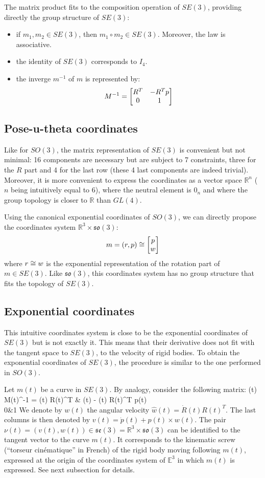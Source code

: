 \documentclass{book}
\begin{document}
The matrix product fits to the composition operation of $SE(3)$, providing directly the group structure of $SE(3)$:
\begin{itemize}
\item if $m_1,m_2 \in SE(3)$, then $m_1 \circ m_2 \in SE(3)$. Moreover, the law is associative.
\item the identity of $SE(3)$ corresponds to $I_4$.
\item the inverge $m^{-1}$ of $m$ is represented by:
\[ M^{-1} = \begin{bmatrix} R^T & -R^T p \\ 0 & 1 \end{bmatrix} \]
\end{itemize}

\subsection{Pose-u-theta coordinates}

Like for $SO(3)$, the matrix representation of $SE(3)$ is convenient but not minimal: 16 components are necessary but are subject to 7 constraints, three for the $R$ part and 4 for the last row (these 4 last components are indeed trivial). Moreover, it is more convenient to express the coordinates as a vector space $\mathbb{R}^n$ ($n$ being intuitively equal to 6), where the neutral element is $0_n$ and where the group topology is closer to $\mathbb{R}$ than $GL(4)$.

Using the canonical exponential coordinates of $SO(3)$, we can directly propose the coordinates system $\mathbb{R}^3 \times \mathfrak{so}(3)$:
\[ m = (r,p) \cong \begin{bmatrix} p \\ w \end{bmatrix} \]
where $r \cong w$ is the exponential representation of the rotation part of $m \in SE(3)$. Like $\mathfrak{so}(3)$, this coordinates system has no group structure that fits the topology of $SE(3)$.

\subsection{Exponential coordinates}

This intuitive coordinates system is close to be the exponential coordinates of $SE(3)$ but is not exactly it. This means that their derivative does not fit with the tangent space to $SE(3)$, \mie to the velocity of rigid bodies. To obtain the exponential coordinates of $SE(3)$, the procedure is similar to the one performed in $SO(3)$. 

Let $m(t)$ be a curve in $SE(3)$. By analogy, consider the following matrix:
 (t) M(t)^{-1} = \BIN {}(t) R(t)^T & (t) - (t) R(t)^T p(t) \\ 0&1 \BOUT \EOUT
We denote by $w(t)$ the angular velocity $\hat{w}(t) = \dot{R}(t) R(t)^T$. The last columns is then denoted by $v(t) = \dot{p}(t) + p(t) \times w(t)$. The pair $\nu(t) = (v(t),w(t)) \in \mathfrak{se}(3) = \mathbb{R}^3 \times \mathfrak{so}(3)$ can be identified to the tangent vector to the curve $m(t)$. It corresponds to the kinematic screw (``torseur cin\'ematique'' in French) of the rigid body moving following $m(t)$, expressed at the origin of the coordinates system of $\mathbb{E}^3$ in which $m(t)$ is expressed. See next subsection for details.
\end{document}
